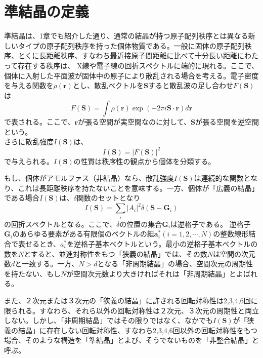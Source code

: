 \documentclass[11pt,a4j]{jreport}
\begin{document}
\section{準結晶の定義}\label{準結晶の定義}
準結晶は、1章でも紹介した通り、通常の結晶が持つ原子配列秩序とは異なる新しいタイプの原子配列秩序を持った個体物質である。一般に固体の原子配列秩序、とくに長距離秩序、すなわち最近接原子間距離に比べて十分長い距離にわたって存在する秩序は、
X線や電子線の回折スペクトルに端的に現れる。ここで、個体に入射した平面波が固体中の原子により散乱される場合を考える。電子密度を与える関数を$\rho({\bm r})$とし、散乱ベクトルを$\bm S$すると散乱波の足し合わせ$F(\bm S)$は
\begin{equation}
  F(\bm S)=\int{\rho(\bm r)} \exp (-2\pi i \bm S\cdot\bm r)d\bm r
\end{equation}
で表される。ここで、$\bm r$が張る空間が実空間なのに対して、$\bm S$が張る空間を逆空間という。\\
さらに散乱強度$I(\bm S)$は、
\begin{equation}
  I(\bm S) =  |F(\bm S)|^2
\end{equation}
で与えられる。$I(\bm S)$の性質は秩序性の観点から個体を分類する。\par
もし、個体がアモルファス（非結晶）なら、散乱強度$I(\bm S)$は連続的な関数となり、これは長距離秩序を持たないことを意味する。一方、個体が「広義の結晶」である場合$I(\bm S)$は、$\delta$関数のセットとなり
\begin{equation}
  I(\bm S) =  \sum_{i}{|A_i|^2\delta(\bm S- \bm G_i)}
\end{equation}
の回折スペクトルとなる。ここで、$\delta$の位置の集合${\bm G_i}$は逆格子である。
逆格子{$\bm G_i$}のあらゆる要素がある有限個のベクトルの組$\bm a_i^*(i=1,2,\cdots,N)$の整数線形結合で表せるとき、$a_i^*$を逆格子基本ベクトルという。最小の逆格子基本ベクトルの数を$N$とすると、並進対称性をもつ「狭義の結晶」では、その数$N$は空間の次元数$d$と一致する。一方、$N>d$となる「非周期結晶」の場合、空間次元の周期性を持たない、もし$N$が空間次元数より大きければそれは「非周期結晶」とよばれる。\par
また、２次元または３次元の「狭義の結晶」に許される回転対称性は2,3,4,6回に限られる。すなわち、それら以外の回転対称性は２次元、３次元の周期性と両立しない。しかし、「非周期結晶」ではその限りではなく、なかでも$I(\bm S)$が「狭義の結晶」に存在しない回転対称性、すなわち2,3,4,6回以外の回転対称性をもつ場合、そのような構造を「準結晶」とよび、そうでないものを「非整合結晶」と呼ぶ。
\end{document}

